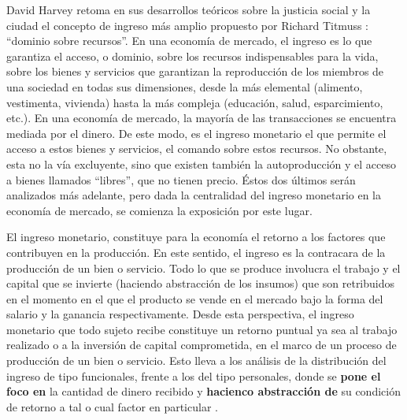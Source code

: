 	David Harvey \citeyear{harvey} retoma en sus desarrollos teóricos sobre la justicia social y la ciudad el concepto de ingreso más amplio propuesto por Richard Titmuss \citeyear{titmuss}: “dominio sobre recursos”. En una economía de mercado, el ingreso es lo que garantiza el acceso, o dominio, sobre los recursos indispensables para la vida, sobre los bienes y servicios que garantizan la reproducción de los miembros de una sociedad en todas sus dimensiones, desde la más elemental (alimento, vestimenta, vivienda) hasta la más compleja (educación, salud, esparcimiento, etc.). En una economía de mercado, la mayoría de las transacciones se encuentra mediada por el dinero. De este modo, es el ingreso monetario el que permite el acceso a estos bienes y servicios, el comando sobre estos recursos. No obstante, esta no la vía excluyente, sino que existen también la autoproducción y el acceso a bienes llamados “libres”, que no tienen precio. Éstos dos últimos serán analizados más adelante, pero dada la centralidad del ingreso monetario en la economía de mercado, se comienza la exposición por este lugar.
	
	El ingreso monetario, constituye para la economía el retorno a los factores que contribuyen en la producción. En este sentido, el ingreso es la contracara de la producción de un bien o servicio. Todo lo que se produce involucra el trabajo y el capital que se invierte (haciendo abstracción de los insumos) que son retribuidos en el momento en el que el producto se vende en el mercado bajo la forma del salario y la ganancia respectivamente. Desde esta perspectiva, el ingreso monetario que todo sujeto recibe constituye un retorno puntual ya sea al trabajo realizado o a la inversión de capital comprometida, en el marco de un proceso de producción de un bien o servicio. Esto lleva a los análisis de la distribución del ingreso de tipo funcionales, frente a los del tipo personales, donde se \textbf{pone el foco en} la cantidad de dinero recibido y \textbf{hacienco abstracción de} su condición de retorno a tal o cual factor en particular \cite{lindemboim,monza,altimir1986,altimir2002,conade}.
	
